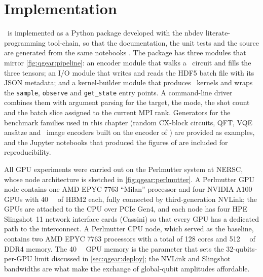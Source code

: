 \section{Implementation}\label{sec:qgear:impl}

\qgear\ is implemented as a Python package developed with the nbdev literate-programming tool-chain, so that the documentation, the unit tests and the source are generated from the same notebooks \cite{guo2025qgearsoftware}. The package has three modules that mirror \cref{fig:qgear:pipeline}: an encoder module that walks a \qiskit\ circuit and fills the three tensors; an I/O module that writes and reads the HDF5 batch file with its JSON metadata; and a kernel-builder module that produces \cudaq\ kernels and wraps the \texttt{sample}, \texttt{observe} and \texttt{get\_state} entry points. A command-line driver combines them with argument parsing for the target, the mode, the shot count and the batch slice assigned to the current MPI rank. Generators for the benchmark families used in this chapter (random CX-block circuits, QFT, VQE ans\"atze and \qcrank\ image encoders built on the encoder of \cite{balewski2024qcrank}) are provided as examples, and the Jupyter notebooks that produced the figures of \cite{guo2025qgear} are included for reproducibility.

All GPU experiments were carried out on the Perlmutter system at NERSC, whose node architecture is sketched in \cref{fig:qgear:perlmutter}. A Perlmutter GPU node contains one AMD EPYC 7763 ``Milan'' processor and four NVIDIA A100 GPUs with \SI{40}{\giga\byte} of HBM2 each, fully connected by third-generation NVLink; the GPUs are attached to the CPU over PCIe Gen4, and each node has four HPE Slingshot~11 network interface cards (Cassini) so that every GPU has a dedicated path to the interconnect. A Perlmutter CPU node, which served as the baseline, contains two AMD EPYC 7763 processors with a total of 128 cores and \SI{512}{\giga\byte} of DDR4 memory. The \SI{40}{\giga\byte} GPU memory is the parameter that sets the 32-qubits-per-GPU limit discussed in \cref{sec:qgear:deploy}; the NVLink and Slingshot bandwidths are what make the exchange of global-qubit amplitudes affordable.


